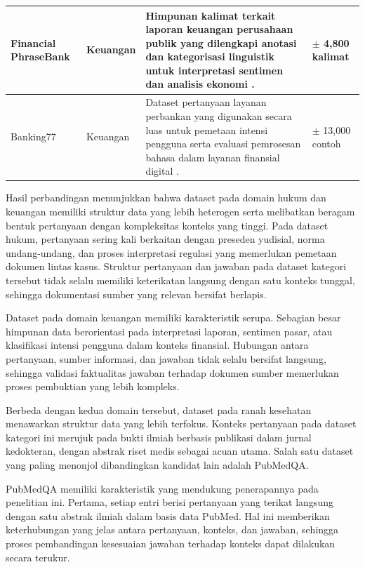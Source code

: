 \begin{longtable}{|>{\raggedright\arraybackslash}p{2.2cm}|>{\raggedright\arraybackslash}p{1.5cm}|>{\raggedright\arraybackslash}p{5.9cm}|>{\raggedright\arraybackslash}p{2.3cm}|}
Financial PhraseBank &
Keuangan &
Himpunan kalimat terkait laporan keuangan perusahaan publik yang dilengkapi anotasi dan kategorisasi linguistik untuk interpretasi sentimen dan analisis ekonomi \parencite{phrasebank}. &
$\pm$ 4{,}800 kalimat
\\ \hline

Banking77 &
Keuangan &
Dataset pertanyaan layanan perbankan yang digunakan secara luas untuk pemetaan intensi pengguna serta evaluasi pemrosesan bahasa dalam layanan finansial digital \parencite{banking77}. &
$\pm$ 13{,}000 contoh
\\ \hline

\end{longtable}
\normalsize

Hasil perbandingan menunjukkan bahwa dataset pada domain hukum dan keuangan memiliki struktur data yang lebih heterogen serta melibatkan beragam bentuk pertanyaan dengan kompleksitas konteks yang tinggi. Pada dataset hukum, pertanyaan sering kali berkaitan dengan preseden yudisial, norma undang-undang, dan proses interpretasi regulasi yang memerlukan pemetaan dokumen lintas kasus. Struktur pertanyaan dan jawaban pada dataset kategori tersebut tidak selalu memiliki keterikatan langsung dengan satu konteks tunggal, sehingga dokumentasi sumber yang relevan bersifat berlapis.

Dataset pada domain keuangan memiliki karakteristik serupa. Sebagian besar himpunan data berorientasi pada interpretasi laporan, sentimen pasar, atau klasifikasi intensi pengguna dalam konteks finansial. Hubungan antara pertanyaan, sumber informasi, dan jawaban tidak selalu bersifat langsung, sehingga validasi faktualitas jawaban terhadap dokumen sumber memerlukan proses pembuktian yang lebih kompleks.

Berbeda dengan kedua domain tersebut, dataset pada ranah kesehatan menawarkan struktur data yang lebih terfokus. Konteks pertanyaan pada dataset kategori ini merujuk pada bukti ilmiah berbasis publikasi dalam jurnal kedokteran, dengan abstrak riset medis sebagai acuan utama. Salah satu dataset yang paling menonjol dibandingkan kandidat lain adalah PubMedQA.

PubMedQA memiliki karakteristik yang mendukung penerapannya pada penelitian ini. Pertama, setiap entri berisi pertanyaan yang terikat langsung dengan satu abstrak ilmiah dalam basis data PubMed. Hal ini memberikan keterhubungan yang jelas antara pertanyaan, konteks, dan jawaban, sehingga proses pembandingan kesesuaian jawaban terhadap konteks dapat dilakukan secara terukur.

